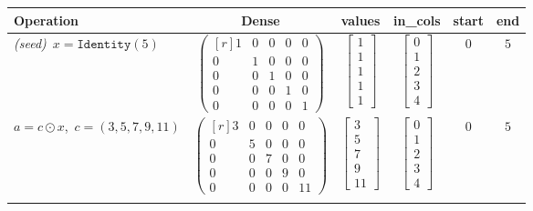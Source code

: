 \documentclass{article}
\begin{document}
  \begingroup
  \setlength{\arraycolsep}{4pt}
  \renewcommand{\arraystretch}{1.25}
  \begin{table}
  \centering
  \footnotesize
  \begin{tabular}{@{}l c c c c c@{}}
  \toprule
  Operation & Dense & values & in\_cols & start & end \\
  \midrule
  \textit{(seed)}\ $x = \texttt{Identity}(5)$ &
    $\begin{pmatrix*}[r]
      1 & 0 & 0 & 0 & 0 \\ 
      0 & 1 & 0 & 0 & 0 \\
      0 & 0 & 1 & 0 & 0 \\
      0 & 0 & 0 & 1 & 0 \\
      0 & 0 & 0 & 0 & 1
    \end{pmatrix*}$ &
    $\begin{bmatrix}1\\1\\1\\1\\1\end{bmatrix}$ &
    $\begin{bmatrix}0\\1\\2\\3\\4\end{bmatrix}$ &
    $0$ & $5$ \\\addlinespace[8pt]

  $a = c \odot x$,\ $c=(3,5,7,9,11)$ &
    $\begin{pmatrix*}[r]
      3 & 0 & 0 & 0 &  0 \\
      0 & 5 & 0 & 0 &  0 \\
      0 & 0 & 7 & 0 &  0 \\
      0 & 0 & 0 & 9 &  0 \\
      0 & 0 & 0 & 0 & 11
    \end{pmatrix*}$ &
    $\begin{bmatrix}3\\5\\7\\9\\11\end{bmatrix}$ &
    $\begin{bmatrix}0\\1\\2\\3\\4\end{bmatrix}$ &
    $0$ & $5$ \\ \addlinespace[8pt]


\end{tabular}
\end{table}
\end{document}
